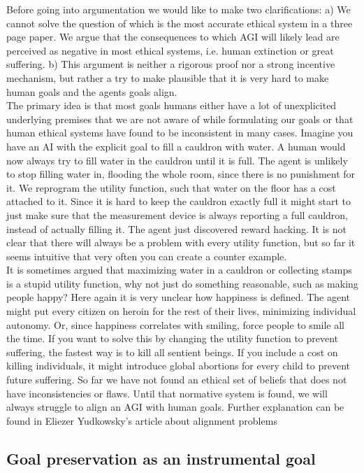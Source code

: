 \documentclass[conference]{IEEEtran}
\begin{document}
Before going into argumentation we would like to make two clarifications: a) We cannot solve the question of which is the most accurate ethical system in a three page paper. We argue that the consequences to which AGI will likely lead are perceived as negative in most ethical systems, i.e. human extinction or great suffering.
b) This argument is neither a rigorous proof nor a strong incentive mechanism, but rather a try to make plausible that it is very hard to make human goals and the agents goals align. \\
The primary idea is that most goals humans either have a lot of unexplicited underlying premises that we are not aware of while formulating our goals or that human ethical systems have found to be inconsistent in many cases. Imagine you have an AI with the explicit goal to fill a cauldron with water. A human would now always try to fill water in the cauldron until it is full. The agent is unlikely to stop filling water in, flooding the whole room, since there is no punishment for it. We reprogram the utility function, such that water on the floor has a cost attached to it. Since it is hard to keep the cauldron exactly full it might start to just make sure that the measurement device is always reporting a full cauldron, instead of actually filling it. The agent just discovered reward hacking. It is not clear that there will always be a problem with every utility function, but so far it seems intuitive that very often you can create a counter example.\\
It is sometimes argued that maximizing water in a cauldron or collecting stamps is a stupid utility function, why not just do something reasonable, such as making people happy? Here again it is very unclear how happiness is defined. The agent might put every citizen on heroin for the rest of their lives, minimizing individual autonomy. Or, since happiness correlates with smiling, force people to smile all the time. If you want to solve this by changing the utility function to prevent suffering, the fastest way is to kill all sentient beings. If you include a cost on killing individuals, it might introduce global abortions for every child to prevent future suffering. So far we have not found an ethical set of beliefs that does not have inconsistencies or flaws. Until that normative system is found, we will always struggle to align an AGI with human goals. Further explanation can be found in Eliezer Yudkowsky's article about alignment problems \cite{AlignmentYudkowsky2016}


\subsection{Goal preservation as an instrumental goal} 
\end{document}
